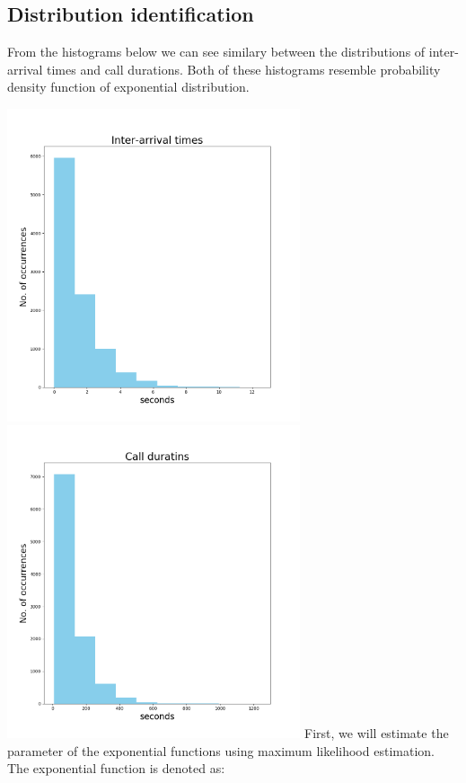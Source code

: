 \documentclass[12pt,a4paper]{article}
\begin{document}
\subsection{Distribution identification}
From the histograms below we can see similary between the distributions of inter-arrival times and call durations. Both of these histograms resemble probability density function of exponential distribution.\par
\smallskip
\noindent \includegraphics[width=3.4in]{Figure_1}
\includegraphics[width=3.4in]{Figure_3}
First, we will estimate the parameter of the exponential functions using maximum likelihood estimation.
The exponential function is denoted as:
\end{document}

